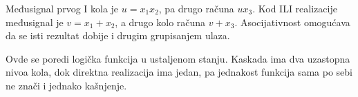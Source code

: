 
Međusignal prvog I kola je \(u=x_1x_2\), pa drugo računa \(ux_3\). Kod ILI realizacije međusignal je \(v=x_1+x_2\), a drugo kolo računa \(v+x_3\). Asocijativnost omogućava da se isti rezultat dobije i drugim grupisanjem ulaza.

Ovde se poredi logička funkcija u ustaljenom stanju. Kaskada ima dva uzastopna nivoa kola, dok direktna realizacija ima jedan, pa jednakost funkcija sama po sebi ne znači i jednako kašnjenje.
